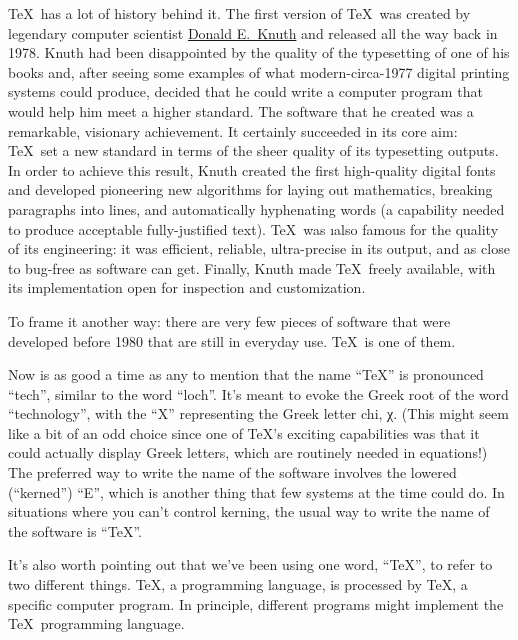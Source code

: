 \hspace{0in}\TeX\ has a lot of history behind it. The first version of \TeX\ was created
by legendary computer scientist
\href{https://en.wikipedia.org/wiki/Donald_Knuth}{Donald E.\ Knuth} and released
all the way back in 1978. Knuth had been disappointed by the quality of the
typesetting of one of his books and, after seeing some examples of what
modern-circa-1977 digital printing systems could produce, decided that he could
write a computer program that would help him meet a higher standard. The
software that he created was a remarkable, visionary achievement. It certainly
succeeded in its core aim: \TeX\ set a new standard in terms of the sheer
quality of its typesetting outputs. In order to achieve this result, Knuth
created the first high-quality digital fonts and developed pioneering new
algorithms for laying out mathematics, breaking paragraphs into lines, and
automatically hyphenating words (a capability needed to produce acceptable
fully-justified text). \TeX\ was \i{also} famous for the quality of its
engineering: it was efficient, reliable, ultra-precise in its output, and as
close to bug-free as software can get. Finally, Knuth made \TeX\ freely
available, with its implementation open for inspection and customization.

To frame it another way: there are very few pieces of software that were
developed before 1980 that are still in everyday use. \TeX\ is one of them.

Now is as good a time as any to mention that the name “\TeX” is pronounced
“tech”, similar to the word “loch”. It's meant to evoke the Greek root of the
word “technology”, with the “X” representing the Greek letter chi, χ. (This
might seem like a bit of an odd choice since one of \TeX's exciting capabilities
was that it could actually display Greek letters, which are routinely needed in
equations!) The preferred way to write the name of the software involves the
lowered (“kerned”) “E”, which is another thing that few systems at the time
could do. In situations where you can't control kerning, the usual way to write
the name of the software is “TeX”.

It's also worth pointing out that we've been using one word, “\TeX”, to refer to
two different things. \TeX, a programming language, is processed by \TeX, a
specific computer program. In principle, different programs might implement the
\TeX\ programming language.

